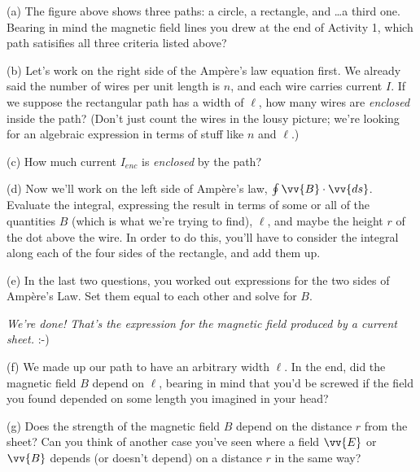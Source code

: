 (a) The figure above shows three paths: a circle, a rectangle, and \ldots a third one.  Bearing in mind the magnetic field lines you drew at the end of Activity 1, which path satisifies all three criteria listed above?
\answerspace{0.3in}

\pagebreak[3]
(b) Let's work on the right side of the Amp\`ere's law equation first.  We already said the number of wires per unit length is $n$, and each wire carries current $I$.  If we suppose the rectangular path has a width of $\ell$, how many wires are \textit{enclosed} inside the path?  (Don't just count the wires in the lousy picture; we're looking for 
an algebraic expression in terms of stuff like $n$ and $\ell$.)
\answerspace{0.3in}

(c) How much current $I_{enc}$ is \textit{enclosed} by the path?
\answerspace{0.5in}

(d) Now we'll work on the left side of Amp\`ere's law, $\oint \vv {B}\cdot \vv{ds}$.  Evaluate the integral, 
expressing the result in terms of some
or all of the quantities $B$ (which is what we're trying
to find), $\ell$, and maybe the height $r$ of the dot above the wire.  In order to do this, you'll have to consider
the integral along each of the four sides of the rectangle,
and add them up.
\answerspace{1.3in}

(e) In the last two questions, you worked out expressions
for the two sides of Amp\`ere's Law. Set them equal to each other
and solve for $B$.
\answerspace{1in}

\centerline{\textit{We're done! That's the expression for the magnetic field produced 
by a current sheet.}  :-)}

(f) We made up our path to have an arbitrary width $\ell$.  In the end, did the magnetic field $B$ depend on $\ell$, bearing in mind that you'd be screwed if the field you found depended on some length you imagined in your head?
\answerspace{0.4in}

(g) Does the strength of the magnetic field $B$ depend on the
distance $r$ from the sheet?  Can you think of another case you've seen where a field $\vv{E}$ or $\vv{B}$ depends (or doesn't depend) on a distance $r$ in the same way?
\answerspace{0.4in}
